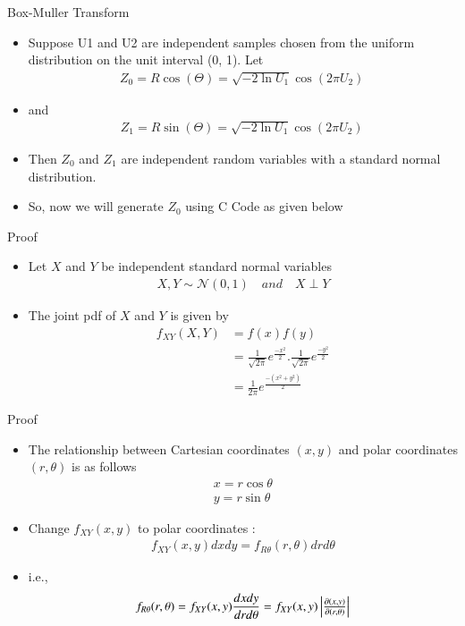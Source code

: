 \documentclass{beamer}
\begin{document}
\begin{frame}{Box-Muller Transform}
  \begin{itemize}
  \item Suppose U1 and U2 are independent samples chosen from the uniform distribution on the unit interval (0, 1). Let
  \begin{align}
  	Z_0 = R \cos(\Theta) =\sqrt{-2 \ln U_1} \cos(2 \pi U_2)\,
  \end{align}
  \item  and
  \begin{align}
  	Z_1 = R \sin(\Theta) =\sqrt{-2 \ln U_1} \cos(2 \pi U_2)\, 
  \end{align}
  \item Then $Z_0$ and $Z_1$ are independent random variables with a standard normal distribution.
  \item So, now we will generate $Z_0$ using C Code as given below 
  \end{itemize}
\end{frame}

\begin{frame}{Proof}
  \begin{itemize}
  \item Let $X$ and $Y$ be independent standard normal variables 
  \begin{align}
  	X,Y \sim \mathcal{N}(0,1) \quad and \quad X\perp Y
  \end{align}
  \item The joint pdf of $X$ and $Y$ is given by 
  \begin{align}
  	f_{XY}(X,Y) &= f(x)f(y)\\
  	&= \frac{1}{\sqrt{2\pi}}e^{\frac{-x^2}{2}}.\frac{1}{\sqrt{2\pi}}e^{\frac{-y^2}{2}}\\
  	&= \frac{1}{2\pi}e^{\frac{-(x^2+y^2)}{2}}
  \end{align}
  \end{itemize}
\end{frame}

\begin{frame}{Proof}
  \begin{itemize} 
  \item The relationship between Cartesian coordinates $(x,y)$ and polar coordinates $(r,\theta)$ is as follows 
  \begin{align}
  	x=r\cos\theta \\
  	y=r\sin\theta
  \end{align}
  \item Change $f_{XY}(x,y)$ to polar coordinates :
  \begin{align}
  	f_{XY}(x,y) dxdy = f_{R\theta}(r,\theta) drd\theta
  \end{align}
  \item i.e.,
  \begin{align}
  	f_{R\theta}(r,\theta) = f_{XY}(x,y) \frac{dxdy}{drd\theta}
  	= f_{XY}(x,y) \begin{vmatrix}\frac{\partial(x,y)}{\partial(r,\theta)}\end{vmatrix}
  \end{align}
  \end{itemize}
\end{frame}
\end{document}
